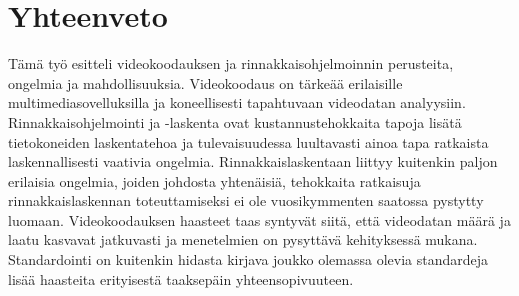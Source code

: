\newpage

\section{Yhteenveto}

Tämä työ esitteli videokoodauksen ja rinnakkaisohjelmoinnin perusteita,
ongelmia ja mahdollisuuksia. Videokoodaus on tärkeää erilaisille
multimediasovelluksilla ja koneellisesti tapahtuvaan videodatan analyysiin.
Rinnakkaisohjelmointi ja -laskenta ovat kustannustehokkaita tapoja lisätä
tietokoneiden laskentatehoa ja tulevaisuudessa luultavasti ainoa tapa ratkaista
laskennallisesti vaativia ongelmia. Rinnakkaislaskentaan liittyy kuitenkin
paljon erilaisia ongelmia, joiden johdosta yhtenäisiä, tehokkaita ratkaisuja
rinnakkaislaskennan toteuttamiseksi ei ole vuosikymmenten saatossa pystytty
luomaan. Videokoodauksen haasteet taas syntyvät siitä, että videodatan määrä
ja laatu kasvavat jatkuvasti ja menetelmien on pysyttävä kehityksessä mukana.
Standardointi on kuitenkin hidasta kirjava joukko olemassa olevia standardeja
lisää haasteita erityisestä taaksepäin yhteensopivuuteen.

